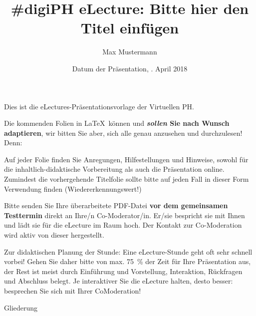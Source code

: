 \documentclass{beamer}
\title{\#digiPH eLecture: Bitte hier den Titel einfügen}
\author{Max Mustermann}
\institute[Lehrstuhl]{
	Name des Lehrstuhls \\
	Name des Instituts/Fachbereichs \\
	Name der Universität, Ort
}
\date[09.04.2018]{Datum der Präsentation, \zB 9. April 2018}
\begin{document}
\begin{withoutheadline}
\begin{frame}
	\small
	\setlength{\parskip}{0.75\baselineskip}
	
	Dies ist die eLectures-Präsentationsvorlage der Virtuellen PH.

	Die kommenden Folien in \LaTeX\ können und \textbf{\emph{sollen} Sie nach Wunsch adaptieren}, wir bitten Sie aber, sich alle genau anzusehen und durchzulesen! Denn:

	Auf jeder Folie finden Sie Anregungen, Hilfestellungen und Hinweise, sowohl für die inhaltlich-didaktische Vorbereitung als auch die Präsentation online. Zumindest die vorhergehende Titelfolie sollte bitte auf jeden Fall in dieser Form Verwendung finden (Wiedererkennungswert!)

	Bitte senden Sie Ihre überarbeitete PDF-Datei \textbf{vor dem gemeinsamen Testtermin} direkt an Ihre/n Co-Moderator/in. Er/sie bespricht sie mit Ihnen und lädt sie für die eLecture im Raum hoch. Der Kontakt zur Co-Moderation wird aktiv von dieser hergestellt.

	\begin{block}{Zur didaktischen Planung der Stunde:}
		Eine eLecture-Stunde geht oft sehr schnell vorbei! Gehen Sie daher bitte von max. \SI{75}{\percent} der Zeit für Ihre Präsentation aus, der Rest ist meist durch Einführung und Vorstellung, Interaktion, Rückfragen und Abschluss belegt. Je interaktiver Sie die eLecture halten, desto besser: besprechen Sie sich mit Ihrer CoModeration!
	\end{block}
\end{frame}

\begin{frame}
	\maketitle
\end{frame}
\end{withoutheadline}

\miniframesoff
\begin{frame}[label=inhalt]{Gliederung}
	\tableofcontents
\end{frame}
\miniframeson
\end{document}
